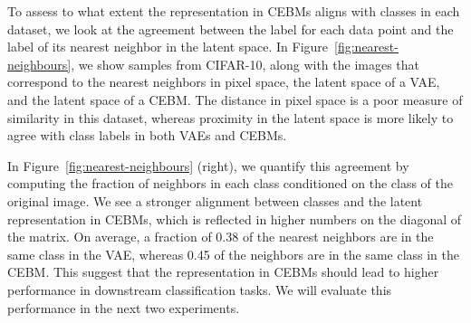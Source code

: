 \documentclass{article}
\begin{document}
To assess to what extent the representation in CEBMs aligns with classes in each dataset, we look at the agreement between the label for each data point and the label of its nearest neighbor in the latent space. In Figure~\ref{fig:nearest-neighbours}, we show samples from CIFAR-10, along with the images that correspond to the nearest neighbors in pixel space, the latent space of a VAE, and the latent space of a CEBM. The distance in pixel space is a poor measure of similarity in this dataset, whereas proximity in the latent space is more likely to agree with class labels in both VAEs and CEBMs. 

In Figure~\ref{fig:nearest-neighbours} (right), we quantify this agreement by computing the fraction of neighbors in each class conditioned on the class of the original image. We see a stronger alignment between classes and the latent representation in CEBMs, which is reflected in higher numbers on the diagonal of the matrix. On average, a fraction of 0.38 of the nearest neighbors are in the same class in the VAE, whereas 0.45 of the neighbors are in the same class in the CEBM. This suggest that the representation in CEBMs should lead to higher performance in downstream classification tasks. We will evaluate this performance in the next two experiments.
\end{document}
